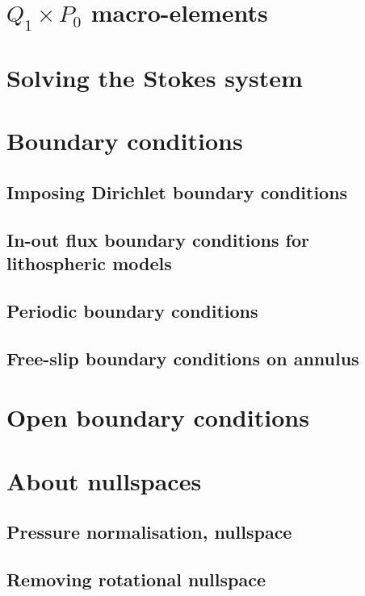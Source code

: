 \section{$Q_1\times P_0$ macro-elements} \label{ss:meshtopos}  %
\newpage
\section{Solving the Stokes system \label{sec:solvers}}  %
\newpage
\section{Boundary conditions}
\subsection{Imposing Dirichlet boundary conditions \label{ss:howtobc}}  %
\newpage %
\subsection{In-out flux boundary conditions for lithospheric models}\label{kin_bc}  
\newpage %
\subsection{Periodic boundary conditions\label{ss_periodic}} %
\newpage %
\subsection{Free-slip boundary conditions on annulus}\label{ss:fsbc_annulus} %
\newpage %
\section{Open boundary conditions}\label{ss:openbc} %
\newpage %
\section{About nullspaces} 
\subsection{Pressure normalisation, nullspace\label{ss_pnorm}}  %
\subsection{Removing rotational nullspace\label{ss_nullspace}}  %

